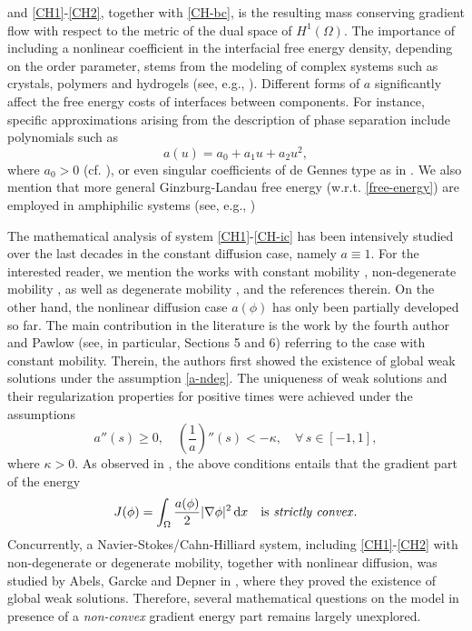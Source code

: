 \documentclass[11pt,reqno]{amsart}
\theoremstyle{remark}
\def\d{{\rm d}}
\numberwithin{equation}{section}
\def\d{{\rm d}}
\begin{document}
and \eqref{CH1}-\eqref{CH2}, together with \eqref{CH-bc}, is the resulting mass conserving gradient flow with respect to the metric of the dual space of $H^1(\Omega)$. The importance of including a nonlinear coefficient in the interfacial free energy density, depending on the order parameter, stems from the modeling of complex systems such as crystals, polymers and hydrogels (see, e.g., \cite{S2}). 
Different forms of $a$ significantly affect the free energy costs of interfaces between components. For instance, specific approximations arising from the description of phase separation include polynomials such as 
$$a(u) = a_0+ a_1u + a_2u^2,$$
where $a_0>0$ (cf. \cite{S36}), or even singular coefficients of de Gennes type as in \cite{S23}. We also mention that more general Ginzburg-Landau free energy (w.r.t. \eqref{free-energy}) are employed in amphiphilic systems (see, e.g., \cite{GS})

The mathematical analysis of system \eqref{CH1}-\eqref{CH-ic} has been intensively studied over the last decades in the constant diffusion case, namely $a\equiv1$. For the interested reader, we mention the works with constant mobility \cite{ABELS2009, AW07, DD, EL1991, GGW2018, MZ},
non-degenerate mobility \cite{BB1999, CGGG2025, S2007, SZ2013}, as well as degenerate mobility \cite{CMN2019, EG1996, DD2016, LMS2012},
and the references therein.
On the other hand, the nonlinear diffusion case $a(\phi)$ has only been partially developed so far. The main contribution in the literature is the work by the fourth author and Pawlow \cite{SP2013} (see, in particular, Sections 5 and 6) referring to the case with constant mobility. Therein, the authors first showed the existence of global weak solutions  under the assumption \eqref{a-ndeg}. The uniqueness of weak solutions and their regularization properties for positive times were achieved under the assumptions
\begin{equation}
\label{convex-condition}
a''(s)\geq 0, \quad \left( \frac{1}{a} \right)''(s)< - \kappa, \quad \forall \, s \in [-1,1],
\end{equation}
where $\kappa>0$. As observed in \cite{SP2013}, the above conditions entails that the gradient part of the energy
$$
J(\phi)= \int_\Omega \frac{a(\phi)}{2} |\nabla \phi|^2 \, \d x
\quad \text{is \textit{strictly convex}} .
$$
Concurrently, a Navier-Stokes/Cahn-Hilliard system, including \eqref{CH1}-\eqref{CH2} with non-degenerate or degenerate mobility, together with nonlinear diffusion, was studied by Abels, Garcke and Depner in \cite{ADG2013, ADG2013-2}, where they proved the existence of global weak solutions. Therefore, several mathematical questions on the model in presence of a \textit{non-convex} gradient energy part remains largely unexplored.
\end{document}
